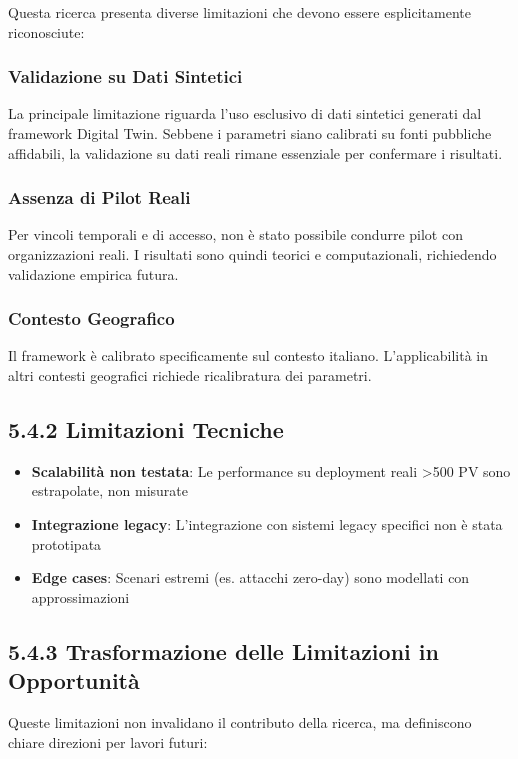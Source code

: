 Questa ricerca presenta diverse limitazioni che devono essere 
esplicitamente riconosciute:

\subsubsection{Validazione su Dati Sintetici}
La principale limitazione riguarda l'uso esclusivo di dati sintetici 
generati dal framework Digital Twin. Sebbene i parametri siano calibrati 
su fonti pubbliche affidabili, la validazione su dati reali rimane 
essenziale per confermare i risultati.

\subsubsection{Assenza di Pilot Reali}
Per vincoli temporali e di accesso, non è stato possibile condurre 
pilot con organizzazioni reali. I risultati sono quindi teorici e 
computazionali, richiedendo validazione empirica futura.

\subsubsection{Contesto Geografico}
Il framework è calibrato specificamente sul contesto italiano. 
L'applicabilità in altri contesti geografici richiede ricalibratura 
dei parametri.

\subsection{5.4.2 Limitazioni Tecniche}

\begin{itemize}
\item \textbf{Scalabilità non testata}: Le performance su deployment 
      reali >500 PV sono estrapolate, non misurate
\item \textbf{Integrazione legacy}: L'integrazione con sistemi legacy 
      specifici non è stata prototipata
\item \textbf{Edge cases}: Scenari estremi (es. attacchi zero-day) 
      sono modellati con approssimazioni
\end{itemize}

\subsection{5.4.3 Trasformazione delle Limitazioni in Opportunità}

Queste limitazioni non invalidano il contributo della ricerca, ma 
definiscono chiare direzioni per lavori futuri:

